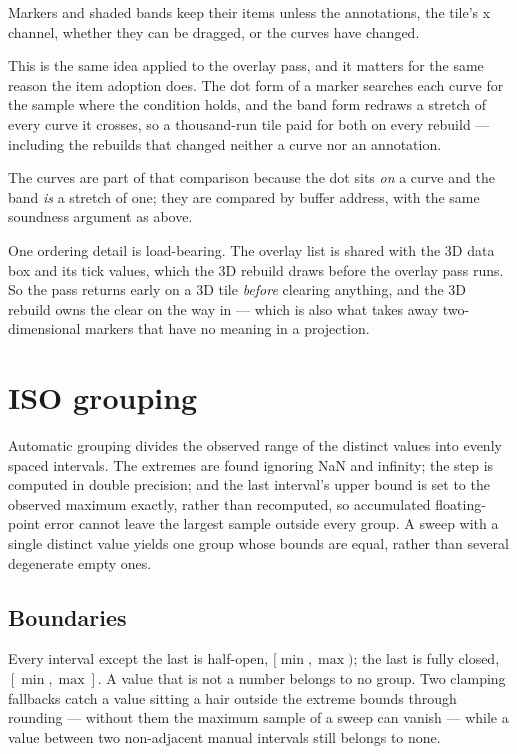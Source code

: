 \documentclass[11pt,a4paper,oneside]{report}
\begin{document}
Markers and shaded bands keep their items unless the annotations, the tile's x
channel, whether they can be dragged, or the curves have changed.

This is the same idea applied to the overlay pass, and it matters for the same
reason the item adoption does. The dot form of a marker searches each curve for
the sample where the condition holds, and the band form redraws a stretch of
every curve it crosses, so a thousand-run tile paid for both on every rebuild
--- including the rebuilds that changed neither a curve nor an annotation.

The curves are part of that comparison because the dot sits \emph{on} a curve
and the band \emph{is} a stretch of one; they are compared by buffer address,
with the same soundness argument as above.

One ordering detail is load-bearing. The overlay list is shared with the 3D data
box and its tick values, which the 3D rebuild draws before the overlay pass
runs. So the pass returns early on a 3D tile \emph{before} clearing anything,
and the 3D rebuild owns the clear on the way in --- which is also what takes
away two-dimensional markers that have no meaning in a projection.

\section{ISO grouping}

Automatic grouping divides the observed range of the distinct values into evenly
spaced intervals. The extremes are found ignoring NaN and infinity; the step is
computed in double precision; and the last interval's upper bound is set to the
observed maximum exactly, rather than recomputed, so accumulated floating-point
error cannot leave the largest sample outside every group. A sweep with a single
distinct value yields one group whose bounds are equal, rather than several
degenerate empty ones.

\subsection{Boundaries}

Every interval except the last is half-open, $[\min, \max)$; the last is fully
closed, $[\min, \max]$. A value that is not a number belongs to no group. Two
clamping fallbacks catch a value sitting a hair outside the extreme bounds
through rounding --- without them the maximum sample of a sweep can vanish ---
while a value between two non-adjacent manual intervals still belongs to none.
\end{document}
